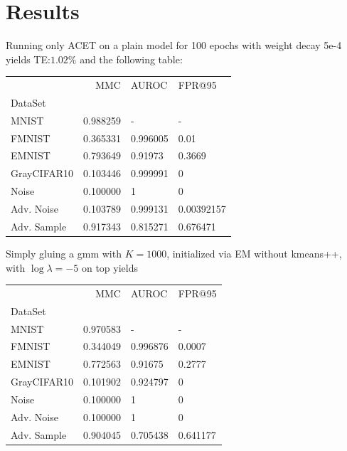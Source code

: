 \documentclass[12pt]{article}
\begin{document}
\section{Results}
Running only ACET on a plain model for 100 epochs with weight decay 5e-4 yields TE:$1.02\%$ and the following table:
\begin{tabular}{lrll}
\toprule
{} &       MMC &     AUROC &      FPR@95 \\
DataSet     &           &           &             \\
\midrule
MNIST       &  0.988259 &         - &           - \\
FMNIST      &  0.365331 &  0.996005 &        0.01 \\
EMNIST      &  0.793649 &   0.91973 &      0.3669 \\
GrayCIFAR10 &  0.103446 &  0.999991 &           0 \\
Noise       &  0.100000 &         1 &           0 \\
Adv. Noise  &  0.103789 &  0.999131 &  0.00392157 \\
Adv. Sample &  0.917343 &  0.815271 &    0.676471 \\
\bottomrule
\end{tabular}
Simply gluing a gmm with $K=1000$, initialized via EM without kmeans++, with $\log \lambda = -5$ on top yields

\begin{tabular}{lrll}
\toprule
{} &       MMC &     AUROC &    FPR@95 \\
DataSet     &           &           &           \\
\midrule
MNIST       &  0.970583 &         - &         - \\
FMNIST      &  0.344049 &  0.996876 &    0.0007 \\
EMNIST      &  0.772563 &   0.91675 &    0.2777 \\
GrayCIFAR10 &  0.101902 &  0.924797 &         0 \\
Noise       &  0.100000 &         1 &         0 \\
Adv. Noise  &  0.100000 &         1 &         0 \\
Adv. Sample &  0.904045 &  0.705438 &  0.641177 \\
\bottomrule
\end{tabular}
\end{document}
